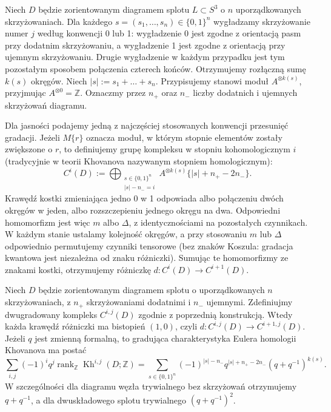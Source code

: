 \begin{definicja}
Niech $D$ będzie zorientowanym diagramem splotu
$L\subset S^3$ o $n$ uporządkowanych skrzyżowaniach.
Dla każdego $s=(s_1,\dots,s_n)\in\{0,1\}^n$
wygładzamy skrzyżowanie numer $j$ według konwencji
0 lub 1: wygładzenie 0 jest zgodne z orientacją
pasm przy dodatnim skrzyżowaniu, a wygładzenie 1
jest zgodne z orientacją przy ujemnym skrzyżowaniu.
Drugie wygładzenie w każdym przypadku jest tym
pozostałym sposobem połączenia czterech końców. Otrzymujemy rozłączną sumę $k(s)$ okręgów.
Niech $|s|:=s_1+\dots+s_n$.
Przypisujemy stanowi moduł $A^{\otimes k(s)}$, przyjmując
$A^{\otimes0}=\mathbb Z$. Oznaczmy przez $n_+$ oraz $n_-$
liczby dodatnich i ujemnych skrzyżowań diagramu.
\end{definicja}

Dla jasności podajemy jedną z najczęściej stosowanych
konwencji przesunięć gradacji. Jeżeli $M\{r\}$ oznacza
moduł, w którym stopnie elementów zostały zwiększone o $r$,
to definiujemy grupę kompleksu w stopniu kohomologicznym $i$
(tradycyjnie w teorii Khovanova nazywanym
stopniem homologicznym):
\[
C^{i}(D):=
\bigoplus_{\substack{s\in\{0,1\}^n\\|s|-n_-=i}}
A^{\otimes k(s)}\{|s|+n_+-2n_-\}.
\]
Krawędź kostki zmieniająca jedno 0 w 1 odpowiada
albo połączeniu dwóch okręgów w jeden, albo rozszczepieniu
jednego okręgu na dwa. Odpowiedni homomorfizm jest więc
$m$ albo $\Delta$, z identycznościami na pozostałych
czynnikach. W każdym stanie ustalamy kolejność
okręgów, a przy stosowaniu $m$ lub $\Delta$
odpowiednio permutujemy czynniki tensorowe
(bez znaków Koszula: gradacja kwantowa jest
niezależna od znaku różniczki).
Sumując te homomorfizmy ze znakami
kostki, otrzymujemy różniczkę $d\colon C^i(D)\to C^{i+1}(D)$.

\begin{stwierdzenie}
\label{prop:kt-kh-graded-euler}
Niech $D$ będzie zorientowanym diagramem splotu
o uporządkowanych $n$ skrzyżowaniach,
z $n_+$ skrzyżowaniami dodatnimi i
$n_-$ ujemnymi. Zdefiniujmy
dwugradowany kompleks $C^{i,j}(D)$
zgodnie z poprzednią konstrukcją.
Wtedy każda krawędź różniczki ma
bistopień $(1,0)$, czyli
$d:C^{i,j}(D)\to C^{i+1,j}(D)$.
Jeżeli $q$ jest zmienną formalną, to
gradująca charakterystyka Eulera
homologii Khovanova ma postać
\[
\sum_{i,j}(-1)^i q^j
\operatorname{rank}_{\mathbb Z}
\operatorname{Kh}^{i,j}(D;\mathbb Z)
=
\sum_{s\in\{0,1\}^n}
(-1)^{|s|-n_-}
q^{|s|+n_+-2n_-}
(q+q^{-1})^{k(s)}.
\]
W szczególności dla diagramu
węzła trywialnego bez skrzyżowań
otrzymujemy $q+q^{-1}$, a dla
dwuskładowego splotu trywialnego
$(q+q^{-1})^2$.
\end{stwierdzenie}

